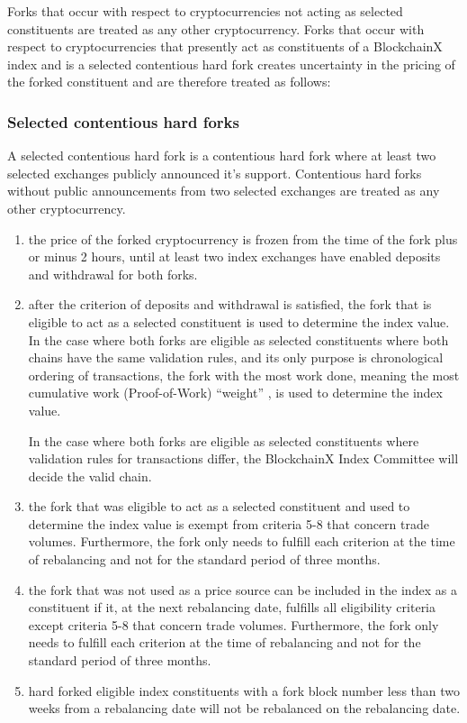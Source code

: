 \documentclass{article}
\begin{document}
Forks that occur with respect to cryptocurrencies not acting as selected constituents are treated as any other cryptocurrency. Forks that occur with respect to cryptocurrencies that presently act as constituents of a BlockchainX index and is a selected contentious hard fork creates uncertainty in the pricing of the forked constituent and are therefore treated as follows:

\subsubsection{Selected contentious hard forks}

A selected contentious hard fork is a contentious hard fork where at least two selected exchanges publicly announced it’s support. Contentious hard forks without public announcements from two selected exchanges are treated as any other cryptocurrency.

\begin{enumerate}

\item the price of the forked cryptocurrency is frozen from the time of the fork plus or minus 2 hours, until at least two index exchanges have enabled deposits and withdrawal for both forks.

\item after the criterion of deposits and withdrawal is satisfied, the fork that is eligible to act as a selected constituent is used to determine the index value. In the case where both forks are eligible as selected constituents where both chains have the same validation rules, and its only purpose is chronological ordering of transactions, the fork with the most work done, meaning the most cumulative work (Proof-of-Work) “weight” , is used to determine the index value.

In the case where both forks are eligible as selected constituents where validation rules for transactions differ, the BlockchainX Index Committee will decide the valid chain.

\item the fork that was eligible to act as a selected constituent and used to determine the index value is exempt from criteria 5-8 that concern trade volumes. Furthermore, the fork only needs to fulfill each criterion at the time of rebalancing and not for the standard period of three months.

\item the fork that was not used as a price source can be included in the index as a constituent if it, at the next rebalancing date, fulfills all eligibility criteria except criteria 5-8 that concern trade volumes. Furthermore, the fork only needs to fulfill each criterion at the time of rebalancing and not for the standard period of three months.

\item hard forked eligible index constituents with a fork block number less than two weeks from a rebalancing date will not be rebalanced on the rebalancing date.

\end{enumerate}
\end{document}
